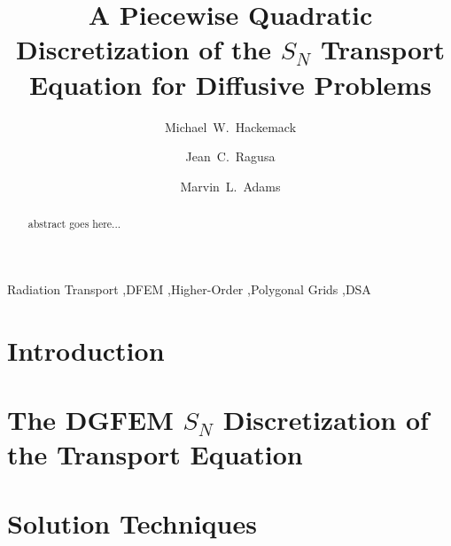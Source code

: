 \documentclass[preprint,review,10pt]{elsarticle}
\begin{document}
\begin{frontmatter}
\title{A Piecewise Quadratic Discretization of the $S_N$ Transport Equation for Diffusive Problems}
\author[kapl]{Michael~W.~Hackemack}
\author[tamu]{Jean~C.~Ragusa}
\author[tamu]{Marvin~L.~Adams}
\address[kapl]{Knolls Atomic Power Laboratory, P.O. Box 1072, Schenectady, NY 12301, USA}
\address[tamu]{Department of Nuclear Engineering, Texas A\&M University, College Station, TX 77843, USA}
\begin{abstract}
abstract goes here...
\end{abstract}
\begin{keyword}
Radiation Transport \sep DFEM \sep Higher-Order \sep Polygonal Grids \sep DSA 
\end{keyword}
\end{frontmatter}

\linenumbers

\section{Introduction} \label{sec::intro}


\section{The DGFEM $S_N$ Discretization of the Transport Equation} \label{sec::trans}


\section{Solution Techniques} \label{sec::Solve}
\end{document}
